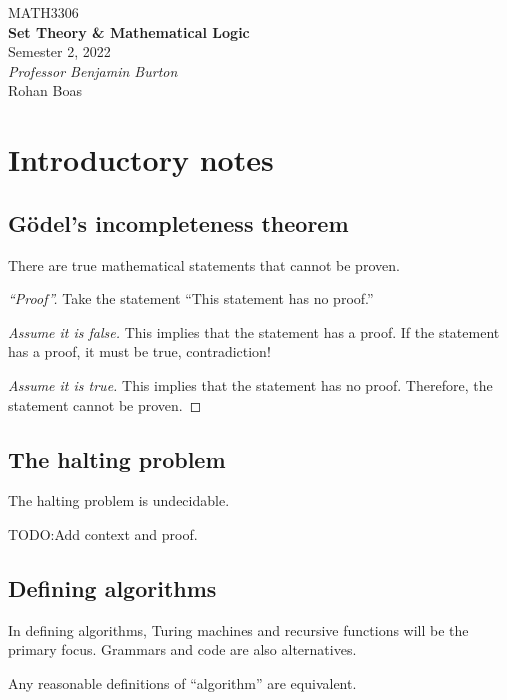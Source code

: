 \documentclass{article}
\date{}
\newcommand{\unitName}{Set Theory \& Mathematical Logic}
\newcommand{\unitCode}{MATH3306}
\newcommand{\unitTime}{Semester 2, 2022}
\newcommand{\unitCoordinator}{Professor Benjamin Burton}
\newcommand{\documentAuthors}{Rohan Boas}
\begin{document}
\begin{titlepage}
    \vspace*{\fill}
    \begin{center}
        \Large{\unitCode} \\[0.05in]
        \LARGE{\textbf{\unitName}} \\[0.1in]
        \normalsize{\unitTime} \\[0.2in]
        \normalsize\textit{\unitCoordinator} \\[0.2in]
        \documentAuthors
    \end{center}
    \vspace*{\fill}
    \doclicenseThis
    \thispagestyle{empty}
\end{titlepage}
\newpage

\tableofcontents
\newpage

\section{Introductory notes}
\subsection{Gödel's incompleteness theorem}
\begin{theorem}
    There are true mathematical statements that cannot be proven.
\end{theorem}
\begin{proof}[``Proof'']
    Take the statement ``This statement has no proof.''

    \emph{Assume it is false.}
    This implies that the statement has a proof.
    If the statement has a proof, it must be true, contradiction!
    
    \emph{Assume it is true.}
    This implies that the statement has no proof.
    Therefore, the statement cannot be proven.
\end{proof}
\subsection{The halting problem}
The halting problem is undecidable.

TODO:\@ Add context and proof.
\subsection{Defining algorithms}
In defining algorithms, Turing machines
and recursive functions will be the primary focus.
Grammars and code are also alternatives. 
\begin{definition}
    Any reasonable definitions of ``algorithm'' are equivalent.
\end{definition}
\end{document}
